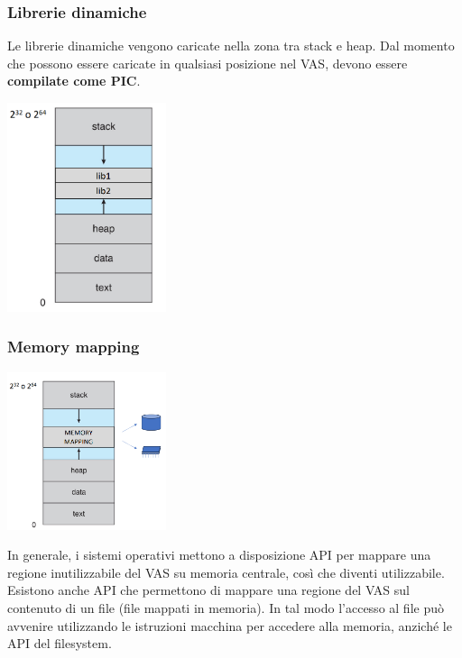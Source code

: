 \documentclass[12pt]{article}
\begin{document}
\subsubsection{Librerie dinamiche}
Le librerie dinamiche vengono caricate nella zona tra stack e heap. Dal momento che possono essere caricate in qualsiasi posizione nel VAS, devono essere \textbf{compilate come PIC}.
\begin{center}
    \includegraphics[width = 0.35\textwidth]{Images/22.png}
\end{center}
\subsubsection{Memory mapping}
\begin{center}
    \includegraphics[width = 0.35\textwidth]{Images/23.png}
\end{center}
In generale, i sistemi operativi mettono a disposizione API per mappare una regione inutilizzabile del VAS su memoria centrale, così che diventi utilizzabile.
Esistono anche API che permettono di mappare una regione del VAS sul contenuto di un file (file mappati in memoria).
In tal modo l'accesso al file può avvenire utilizzando le istruzioni macchina per accedere alla memoria, anziché le API del filesystem.
\end{document}
